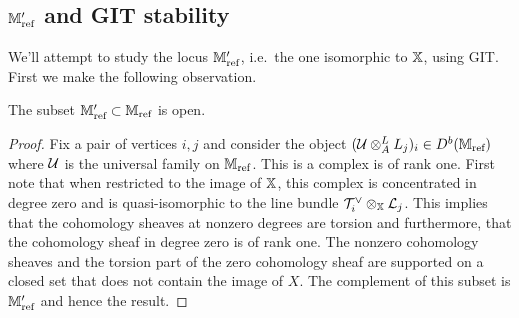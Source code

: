\documentclass[12pt]{amsart}
\begin{document}
\subsection{$\mathbb{M}_{\text{ref}}'$ and GIT stability}

We'll attempt to study the locus $\mathbb{M}_{\text{ref}}'$, i.e.\ the one isomorphic to $\mathbb{X}$, using GIT.
First we make the following observation.

\begin{lemma}\label{lm:open}
The subset $\mathbb{M}_{\textup{ref}}' \subset \mathbb{M}_{\textup{ref}}$ is open.
\end{lemma}

\begin{proof}
Fix a pair of vertices $i,j$ and consider the object $(\mathcal{U} \otimes^L_A L_j)_i \in D^b(\mathbb{M}_\text{ref})$ where $\mathcal{U}$ is the universal family on  $\mathbb{M}_{\text{ref}}$. This is a complex is of rank one.
First note that when restricted to the image of $\mathbb{X}$, this complex is concentrated in degree zero and is quasi-isomorphic to the line bundle $\mathcal{T}_i^{\vee} \otimes_{\mathbb{X}} \mathcal{L}_j$. This implies that the cohomology sheaves at nonzero degrees are torsion and furthermore, that the cohomology sheaf in degree zero is of rank one.
The nonzero cohomology sheaves and the torsion part of the zero cohomology sheaf are supported on a closed set that does not contain the image of $X$. The complement of this subset is $\mathbb{M}_{\text{ref}}'$ and hence the result.
\end{proof}
\end{document}
